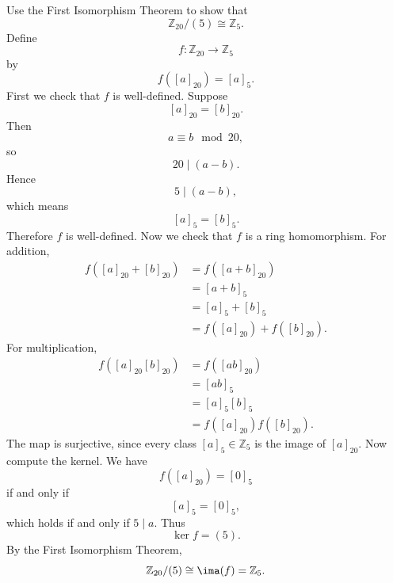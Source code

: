 \begin{problem}{
    Use the First Isomorphism Theorem to show that
    \[
        \mathbb{Z}_{20}/(5) \cong \mathbb{Z}_5.
    \]
}
    Define
    \[
        f:\mathbb{Z}_{20}\to \mathbb{Z}_5
    \]
    by
    \[
        f([a]_{20}) = [a]_5.
    \]
    First we check that $f$ is well-defined.
    Suppose
    \[
        [a]_{20} = [b]_{20}.
    \]
    Then
    \[
        a\equiv b\mod 20,
    \]
    so
    \[
        20\mid (a-b).
    \]
    Hence
    \[
        5\mid (a-b),
    \]
    which means
    \[
        [a]_5 = [b]_5.
    \]
    Therefore $f$ is well-defined.
    Now we check that $f$ is a ring homomorphism.
    For addition,
    \begin{align*}
        f([a]_{20} + [b]_{20})
        &=
        f([a+b]_{20})\\
        &=
        [a+b]_5\\
        &=
        [a]_5 + [b]_5\\
        &=
        f([a]_{20}) + f([b]_{20}).
    \end{align*}
    For multiplication,
    \begin{align*}
        f([a]_{20}[b]_{20})
        &=
        f([ab]_{20})\\
        &=
        [ab]_5\\
        &=
        [a]_5[b]_5\\
        &=
        f([a]_{20})f([b]_{20}).
    \end{align*}
    The map is surjective, since every class $[a]_5\in \mathbb{Z}_5$ is the image of $[a]_{20}$.
    Now compute the kernel.
    We have
    \[
        f([a]_{20}) = [0]_5
    \]
    if and only if
    \[
        [a]_5 = [0]_5,
    \]
    which holds if and only if $5\mid a$.
    Thus
    \[
        \ker f = (5).
    \]
    By the First Isomorphism Theorem,
    \[
        \mathbb{Z}_{20}/(5)\cong \ima(f)=\mathbb{Z}_5.
    \]
\end{problem}
